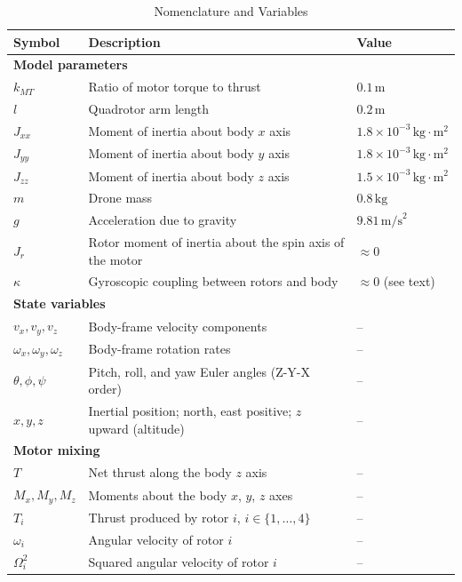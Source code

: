 \documentclass[conf]{new-aiaa}
\begin{document}
\begin{table}[!htbp]
\centering
\caption{Nomenclature and Variables}
\label{tab:constants}
\renewcommand{\arraystretch}{0.90}
\begin{tabular}{lll}
\toprule
\textbf{Symbol} & \textbf{Description} & \textbf{Value} \\
\midrule
\multicolumn{3}{l}{\textbf{Model parameters}} \\
$k_{MT}$ & Ratio of motor torque to thrust & $0.1\,\text{m}$ \\
$l$ & Quadrotor arm length & $0.2\,\text{m}$ \\
$J_{xx}$ & Moment of inertia about body $x$ axis & $1.8\times10^{-3}\,\text{kg}\cdot\text{m}^2$ \\
$J_{yy}$ & Moment of inertia about body $y$ axis & $1.8\times10^{-3}\,\text{kg}\cdot\text{m}^2$ \\
$J_{zz}$ & Moment of inertia about body $z$ axis & $1.5\times10^{-3}\,\text{kg}\cdot\text{m}^2$ \\
$m$ & Drone mass & $0.8\,\text{kg}$ \\
$g$ & Acceleration due to gravity & $9.81\,\text{m/s}^2$ \\
$J_r$ & Rotor moment of inertia about the spin axis of the motor & $\approx 0$ \\
$\kappa$ & Gyroscopic coupling between rotors and body & $\approx 0$ (see text) \\
\midrule
\multicolumn{3}{l}{\textbf{State variables}} \\
$v_x, v_y, v_z$ & Body-frame velocity components & -- \\
$\omega_x, \omega_y, \omega_z$ & Body-frame rotation rates & -- \\
$\theta, \phi, \psi$ & Pitch, roll, and yaw Euler angles (Z-Y-X order) & -- \\
$x, y, z$ & Inertial position; north, east positive; $z$ upward (altitude) & -- \\
\midrule
\multicolumn{3}{l}{\textbf{Motor mixing}} \\
$T$ & Net thrust along the body $z$ axis & -- \\
$M_x, M_y, M_z$ & Moments about the body $x$, $y$, $z$ axes & -- \\
$T_i$ & Thrust produced by rotor $i$, $i \in \{1,\dots,4\}$ & -- \\
$\omega_i$ & Angular velocity of rotor $i$ & -- \\
$\Omega_i^2$ & Squared angular velocity of rotor $i$ & -- \\

\end{tabular}
\end{table}
\end{document}
